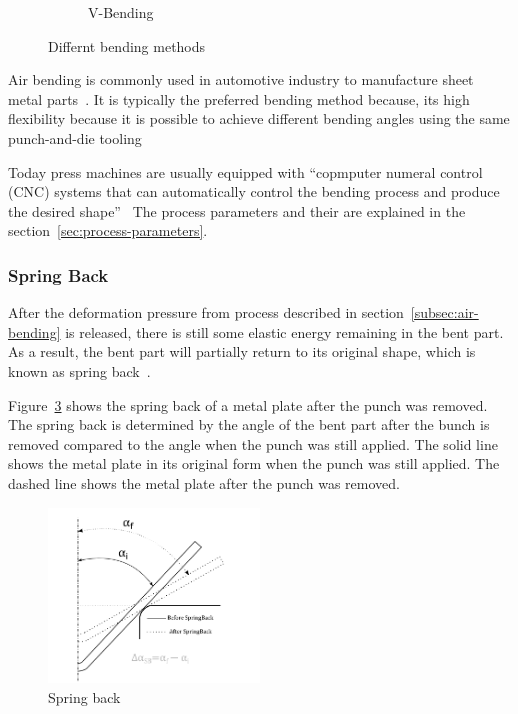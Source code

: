 \begin{figure}[h]
\begin{tcolorbox}[arc=0pt,boxrule=0.5pt, colback=white]
\begin{subfigure}{0.3\textwidth}
            \caption{V-Bending}
            \label{fig:v-bending}
        \end{subfigure}
        \hfill
    \end{tcolorbox}
    \caption{Differnt bending methods~\cite[pp. 416]{groover_fundamentalsmodernmanufacturing_2020}}
    \label{fig:bending-methods}
\end{figure}

Air bending is commonly used in automotive industry to manufacture sheet metal
parts~\cite[p. 342]{kim_predictionbendallowance_2007}.
It is typically the preferred bending method because, its high flexibility because it
is possible to achieve different bending angles using the same punch-and-die
tooling~\cite[p. 3]{miranda_formingspringbackprediction_2018}\cite[p. 1]{cruz_applicationmachinelearning_2021}

Today press machines are usually equipped with ``copmputer numeral control (CNC) systems that can automatically
control the bending process and
produce the desired shape''~\cite[p. 3]{miranda_formingspringbackprediction_2018}
The process parameters and their are explained in the section~\ref{sec:process-parameters}.

\subsubsection{Spring Back}\label{sec:spring-back}
After the deformation pressure from process described in section~\ref{subsec:air-bending} is released, there is still
some elastic energy remaining in the bent part.
As a result, the bent part will partially return to its original
shape, which is known as spring back~\cite[p. 413--414]{groover_fundamentalsmodernmanufacturing_2020}.

Figure~\ref{fig:spring-back} shows the spring back of a metal plate after the punch was removed.
The spring back is determined by the angle of the bent part after the bunch is removed compared to the angle when
the punch was still applied.
The solid line shows the metal plate in its original form when the punch was still
applied. The dashed line shows the metal plate after the punch was removed.

\begin{figure}[ht]
    \centering
    \includegraphics[width=0.5\textwidth]{chap3/images/spring-back}
    \caption{Spring back~\cite[p. 5]{cruz_applicationmachinelearning_2021}}
    \label{fig:spring-back}
\end{figure}

